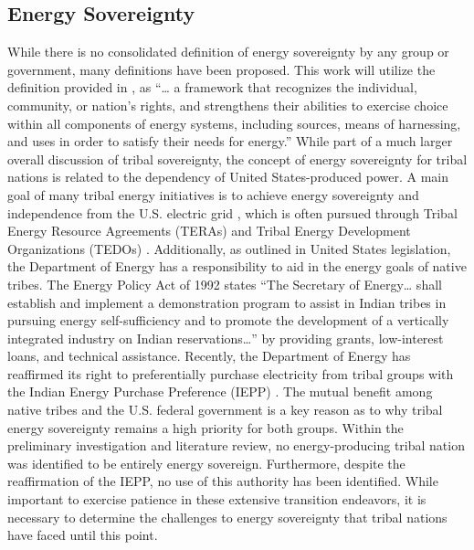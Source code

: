 \documentclass{anstrans}
\begin{document}
\subsection{Energy Sovereignty}
While there is no consolidated definition of energy sovereignty by any group or
government, many definitions have been proposed. This work will utilize the
definition provided in \cite{laldjebaev_energy_2016}, as “… a framework that
recognizes the individual, community, or nation's rights, and strengthens their
abilities to exercise choice within all components of energy systems, including
sources, means of harnessing, and uses in order to satisfy their needs for
energy.” While part of a much larger overall discussion of tribal sovereignty,
the concept of energy sovereignty for tribal nations is related to the
dependency of United States-produced power. A main goal of many tribal energy
initiatives is to achieve energy sovereignty and independence from the U.S.
electric grid \cite{western_area_power_administration_tribal_2010}, which is
often pursued through Tribal Energy Resource Agreements (TERAs) and Tribal
Energy Development Organizations (TEDOs) \cite{department_of_interior_25_2008}.
Additionally, as outlined in United States legislation, the Department of Energy
has a responsibility to aid in the energy goals of native tribes. The Energy
Policy Act of 1992 \cite{rep_sharp_hr776_1992} states “The Secretary of Energy…
shall establish and implement a demonstration program to assist in Indian tribes
in pursuing energy self-sufficiency and to promote the development of a
vertically integrated industry on Indian reservations…” by providing grants,
low-interest loans, and technical assistance. Recently, the Department of Energy
has reaffirmed its right to preferentially purchase electricity from tribal
groups with the Indian Energy Purchase Preference (IEPP)
\cite{granholm_memorandum_2023}. The mutual benefit among native tribes and the
U.S. federal government is a key reason as to why tribal energy sovereignty
remains a high priority for both groups. Within the preliminary investigation
and literature review, no energy-producing tribal nation was identified to be
entirely energy sovereign. Furthermore, despite the reaffirmation of the IEPP,
no use of this authority has been identified. While important to exercise
patience in these extensive transition endeavors, it is necessary to determine
the challenges to energy sovereignty that tribal nations have faced until this
point.
\end{document}
